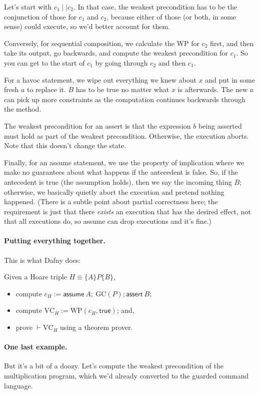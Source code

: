 \documentclass[11pt]{article}
\begin{document}
Let's start with $c_1 \mid\mid c_2$. In that case, the weakest precondition has to be the conjunction of those for $c_1$ and $c_2$, because either of those
(or both, in some sense) could execute, so we'd better account for them.

Conversely, for sequential composition, we calculate the WP for $c_2$ first, and then take its output, go backwards, and compute the weakest precondition for
$c_1$. So you can get to the start of $c_1$ by going through $c_2$ and then $c_1$.

For a \textsf{havoc} statement, we wipe out everything we knew about $x$ and put in some fresh $a$ to replace it. $B$ has to be true no matter what $x$ is afterwards. The new $a$ can pick up more constraints
as the computation continues backwards through the method.

The weakest precondition for an \textsf{assert} is that the expression $b$ being asserted must hold as part of the weakest precondition. Otherwise, the execution aborts. Note that this doesn't change the state.

Finally, for an \textsf{assume} statement, we use the property of implication where we make no guarantees about what happens if the antecedent is false.
So, if the antecedent is true (the assumption holds), then we say the incoming thing $B$; otherwise, we basically quietly abort the execution and pretend nothing happened. (There is a subtle point about partial correctness here; the requirement is just that there \emph{exists} an execution that has the desired effect, not that all executions do, so \textsf{assume} can drop executions and it's fine.)

\paragraph{Putting everything together.} This is what Dafny does:

Given a Hoare triple $H \equiv \{ A \} P \{ B \}$,
\begin{itemize}[noitemsep]
\item compute $c_H := \mathsf{assume~}A; ~\mathrm{GC}(P); \mathsf{assert~}B$;
\item compute $\mathrm{VC}_H := \mathrm{WP}(c_H, \mathsf{true})$; and,
\item prove $\vdash \mathrm{VC}_H$ using a theorem prover.
\end{itemize}

\paragraph{One last example.} But it's a bit of a doozy. Let's compute the weakest precondition of the multiplication program, which we'd already converted to the guarded command language.
\end{document}
